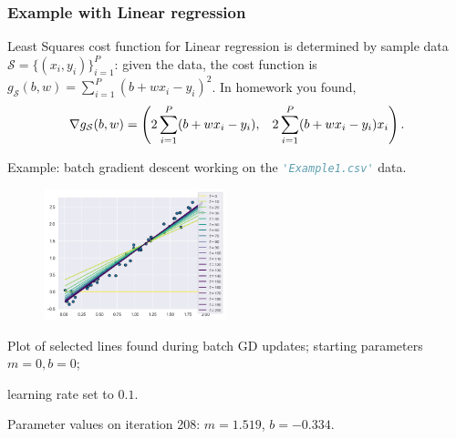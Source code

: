 \documentclass{beamer}
\newcommand{\ct}[1]{\lstinline[language=Python]!#1!}
\begin{document}
\begin{frame}
    \frametitle{Example with Linear regression}
    Least Squares cost function for Linear regression is determined by sample data $\mathcal S=\{(x_i,y_i)\}_{i=1}^P$: given the data, the cost function is $g_{\mathcal S}(b,w) = \sum_{i=1}^P(b+wx_i - y_i)^2$. In homework you found, 
        \[\nabla g_{\mathcal S}(b,w) = 
        {\footnotesize
        \left( 2\sum_{i=1}^P(b+wx_i - y_i), \quad 2\sum_{i=1}^P(b+wx_i - y_i)x_i \right).
        }
        \]
    
    Example: batch gradient descent working on the \ct{'Example1.csv'} data.

    \begin{figure}
        \includegraphics[width=0.47\textwidth]{../../Images/GDonExampleData.png}
    \end{figure} 
    \phantom{line}\newline 
    \vfill
    Plot of selected lines found during batch GD updates; starting parameters $m=0, b=0$; 
    
    \pause
    learning rate set to $0.1$.
    
    Parameter values on iteration 208: $m=1.519$, $b=-0.334$.
    \vfill
    
\end{frame}
\end{document}
